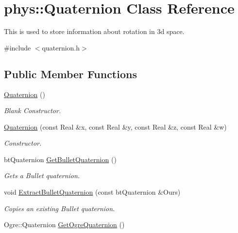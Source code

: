 \hypertarget{classphys_1_1Quaternion}{
\section{phys::Quaternion Class Reference}
\label{df/d8c/classphys_1_1Quaternion}
}


This is used to store information about rotation in 3d space.  




{\ttfamily \#include $<$quaternion.h$>$}

\subsection*{Public Member Functions}
\begin{DoxyCompactItemize}
\item 
\hyperlink{classphys_1_1Quaternion_aca4ee6fd6d3967f06cc4a32361fa5a62}{Quaternion} ()
\begin{DoxyCompactList}\small\item\em Blank Constructor. \item\end{DoxyCompactList}\item 
\hyperlink{classphys_1_1Quaternion_ac8037875c08ce10c0195f3e6fd08b172}{Quaternion} (const Real \&x, const Real \&y, const Real \&z, const Real \&w)
\begin{DoxyCompactList}\small\item\em Constructor. \item\end{DoxyCompactList}\item 
btQuaternion \hyperlink{classphys_1_1Quaternion_afcda116299201599a803e48719f6d50e}{GetBulletQuaternion} ()
\begin{DoxyCompactList}\small\item\em Gets a Bullet quaternion. \item\end{DoxyCompactList}\item 
void \hyperlink{classphys_1_1Quaternion_a10d3582b2731e70279d7bab43173f317}{ExtractBulletQuaternion} (const btQuaternion \&Ours)
\begin{DoxyCompactList}\small\item\em Copies an existing Bullet quaternion. \item\end{DoxyCompactList}\item 
Ogre::Quaternion \hyperlink{classphys_1_1Quaternion_a022ed1ed25a8324b8fc0c4d8b0e7a675}{GetOgreQuaternion} ()

\end{DoxyCompactItemize}

